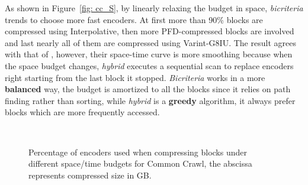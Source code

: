 \documentclass{sig-alternate-05-2015}
\begin{document}
As shown in Figure~\ref{fig: cc_S}, by linearly relaxing the budget in space, \textit{bicriteria} trends to choose more fast encoders.
At first more than 90\% blocks are compressed using Interpolative, then more PFD-compressed blocks are involved and last nearly all of them are compressed using Varint-G8IU.
The result agrees with that of \cite{ottaviano2015optimal}, however, their space-time curve is more smoothing because when the space budget changes, \textit{hybrid} executes a sequential scan to replace encoders right starting from the last block it stopped.
\textit{Bicriteria} works in a more \textbf{balanced} way, the budget is amortized to all the blocks since it relies on path finding rather than sorting, while \textit{hybrid} is a \textbf{greedy} algorithm, it always prefer blocks which are more frequently accessed.
\begin{figure}
	\centering
	\\
	\caption{Percentage of encoders used when compressing blocks under different space/time budgets for Common Crawl, the abscissa represents compressed size in GB.}
	\label{fig: percentage}
\end{figure}
\end{document}
